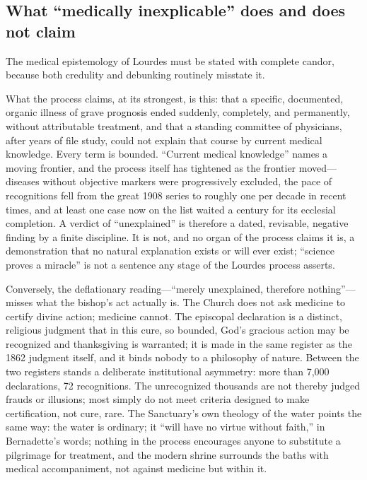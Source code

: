 \subsection{What ``medically inexplicable'' does and does not
claim}

The medical epistemology of Lourdes must be stated with complete
candor, because both credulity and debunking routinely misstate
it.

What the process claims, at its strongest, is this: that a
specific, documented, organic illness of grave prognosis ended
suddenly, completely, and permanently, without attributable
treatment, and that a standing committee of physicians, after
years of file study, could not explain that course by current
medical knowledge. Every term is bounded. ``Current medical
knowledge'' names a moving frontier, and the process itself has
tightened as the frontier moved---diseases without objective
markers were progressively excluded, the pace of recognitions
fell from the great 1908 series to roughly one per decade in
recent times, and at least one case now on the list waited a
century for its ecclesial completion. A verdict of
``unexplained'' is therefore a dated, revisable, negative
finding by a finite discipline. It is not, and no organ of the
process claims it is, a demonstration that no natural explanation
exists or will ever exist; ``science proves a miracle'' is not a
sentence any stage of the Lourdes process asserts.

Conversely, the deflationary reading---``merely unexplained,
therefore nothing''---misses what the bishop's act actually is.
The Church does not ask medicine to certify divine action;
medicine cannot. The episcopal declaration is a distinct,
religious judgment that in this cure, so bounded, God's gracious
action may be recognized and thanksgiving is warranted; it is
made in the same register as the 1862 judgment itself, and it
binds nobody to a philosophy of nature. Between the two registers
stands a deliberate institutional asymmetry: more than 7{,}000
declarations, 72 recognitions. The unrecognized thousands are not
thereby judged frauds or illusions; most simply do not meet
criteria designed to make certification, not cure, rare. The
Sanctuary's own theology of the water points the same way: the
water is ordinary; it ``will have no virtue without faith,'' in
Bernadette's words; nothing in the process encourages anyone to
substitute a pilgrimage for treatment, and the modern shrine
surrounds the baths with medical accompaniment, not against
medicine but within it.


